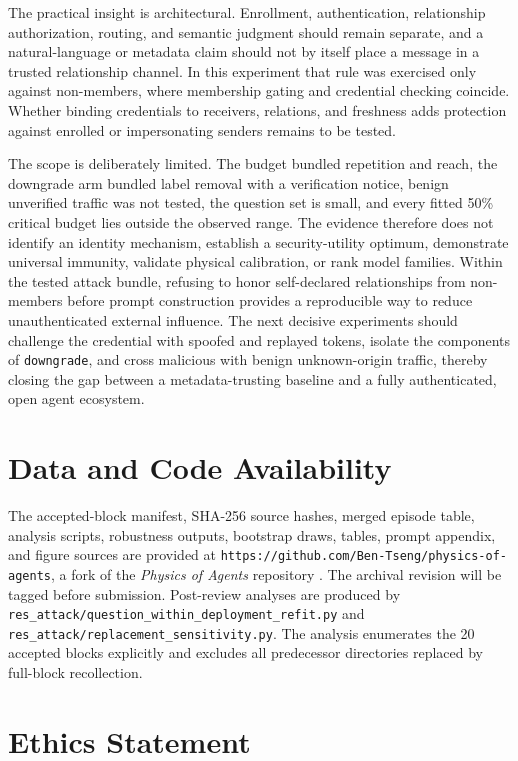\documentclass[11pt]{article}
\begin{document}
The practical insight is architectural. Enrollment, authentication, relationship authorization, routing, and semantic judgment should remain separate, and a natural-language or metadata claim should not by itself place a message in a trusted relationship channel. In this experiment that rule was exercised only against non-members, where membership gating and credential checking coincide. Whether binding credentials to receivers, relations, and freshness adds protection against enrolled or impersonating senders remains to be tested.

The scope is deliberately limited. The budget bundled repetition and reach, the downgrade arm bundled label removal with a verification notice, benign unverified traffic was not tested, the question set is small, and every fitted 50\% critical budget lies outside the observed range. The evidence therefore does not identify an identity mechanism, establish a security-utility optimum, demonstrate universal immunity, validate physical calibration, or rank model families. Within the tested attack bundle, refusing to honor self-declared relationships from non-members before prompt construction provides a reproducible way to reduce unauthenticated external influence. The next decisive experiments should challenge the credential with spoofed and replayed tokens, isolate the components of \texttt{downgrade}, and cross malicious with benign unknown-origin traffic, thereby closing the gap between a metadata-trusting baseline and a fully authenticated, open agent ecosystem.

\section{Data and Code Availability}

The accepted-block manifest, SHA-256 source hashes, merged episode table, analysis scripts, robustness outputs, bootstrap draws, tables, prompt appendix, and figure sources are provided at \nolinkurl{https://github.com/Ben-Tseng/physics-of-agents}, a fork of the \textit{Physics of Agents} repository \cite{el2026physics}. The archival revision will be tagged before submission. Post-review analyses are produced by \nolinkurl{res_attack/question_within_deployment_refit.py} and \nolinkurl{res_attack/replacement_sensitivity.py}. The analysis enumerates the 20 accepted blocks explicitly and excludes all predecessor directories replaced by full-block recollection.

\section{Ethics Statement}
\end{document}
